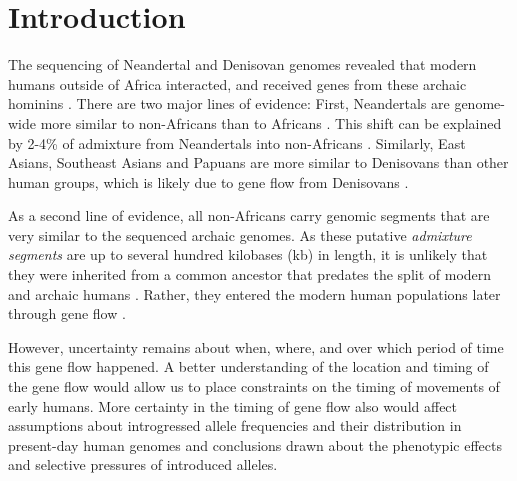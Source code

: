 \documentclass[11pt]{article}
\let\oldparagraph\paragraph
\renewcommand{\paragraph}[1]{\oldparagraph{#1}\mbox{}}
\begin{document}
\section{Introduction}\label{introduction}

The sequencing of Neandertal  \citep{green_draft_2010,prufer_complete_2013,prufer_high-coverage_2017, mafessoni_high_coverage_2020} and Denisovan genomes \citep{reich_genetic_2010, meyer_high-coverage_2012} revealed that modern humans outside of Africa interacted, and received genes from these archaic hominins \citep{vernot_resurrecting_2014,fu_genome_2014,sankararaman_genomic_2014,fu_early_2015,malaspinas_genomic_2016,sankararaman_combined_2016,vernot_excavating_2016}. There are two major lines of evidence: First, Neandertals are genome-wide more similar to non-Africans than to Africans \citep{green_draft_2010}. This shift can be explained by 2-4\% of admixture from Neandertals into non-Africans \citep{green_draft_2010, prufer_complete_2013}. Similarly, East Asians, Southeast Asians and Papuans are more similar to Denisovans than other human groups, which is likely due to gene flow from Denisovans \citep{meyer_high-coverage_2012}. 

As a second line of evidence, all non-Africans carry genomic segments that are very similar to the sequenced archaic genomes. As these putative \emph{admixture segments} are up to several hundred kilobases (kb) in length, it is unlikely that they were inherited from a common ancestor that predates the split of modern and archaic humans \citep{sankararaman_genomic_2014, vernot_resurrecting_2014}. Rather, they entered the modern human populations later through gene flow \citep{sankararaman_date_2012,sankararaman_genomic_2014, vernot_resurrecting_2014, sankararaman_combined_2016,vernot_excavating_2016}. 


However, uncertainty remains about when, where, and over which period of time this gene flow happened. A better understanding of  the location and timing of the gene flow would allow us to place  constraints on the timing of movements of early  humans. More certainty in the timing of gene flow also would affect  assumptions about introgressed allele frequencies and their distribution in present-day human genomes and conclusions drawn about the phenotypic effects and selective pressures of introduced alleles.
\end{document}
